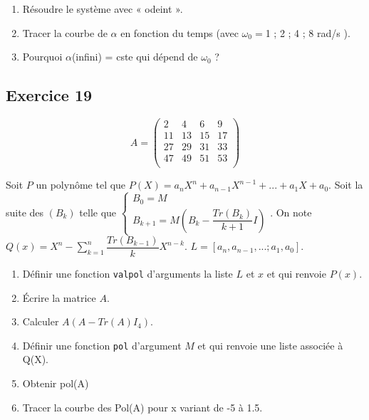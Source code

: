 \begin{enumerate}
\item Résoudre le système avec « odeint ».

\item Tracer la courbe de $\alpha$ en fonction du temps (avec $\omega_0 =$1 ; 2 ; 4 ; 8 rad/s ).

\item Pourquoi $\alpha$(infini) = cste qui dépend de $\omega_0$ ?
\end{enumerate}

\subsection*{Exercice 19}
$$ A= \begin{pmatrix}
2 & 4 & 6 & 9 \\
11 & 13 & 15 & 17 \\
27 & 29 & 31 & 33 \\
47 & 49 & 51 & 53 \\
\end{pmatrix}$$

Soit $P$ un polynôme tel que $P(X)=a_n X^n + a_{n-1}X^{n-1} + ... + a_1 X + a_0$. Soit la suite des $(B_k)$ telle que $\left\{ \begin{array}{c} B_0 = M \\ B_{k+1} = M\left( B_k - \dfrac{Tr(B_k)}{k+1} I\right)\end{array}\right.$. On note $Q(x)=X^n - \sum \limits^n_{k=1}  \dfrac{Tr(B_{k-1})}{k}X^{n-k}$. $L=[a_n,a_{n-1},...;a_1,a_0]$.

\begin{enumerate}
\item Définir une fonction \texttt{valpol} d’arguments la liste $L$ et $x$ et qui renvoie $P(x)$. 
\item Écrire la matrice $A$.
\item Calculer $A(A-Tr(A)I_4)$.
\item Définir une fonction \texttt{pol} d’argument $M$ et qui renvoie une liste associée à Q(X).
\item Obtenir pol(A)
\item Tracer la courbe des Pol(A) pour x variant de -5 à 1.5.
\end{enumerate}

